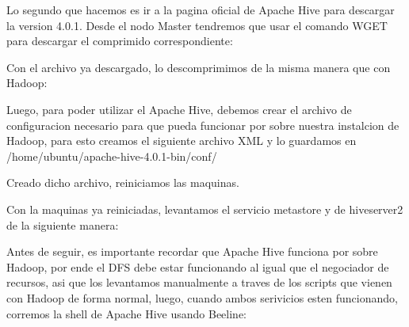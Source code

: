 \documentclass[9pt,letterpaper,twoside]{article}
\begin{document}
\noindent
Lo segundo que hacemos es ir a la pagina oficial de Apache Hive para descargar la version
4.0.1. Desde el nodo Master tendremos que usar el comando WGET para descargar el comprimido correspondiente:

\begin{code}[H]
    
\end{code}

\noindent
Con el archivo ya descargado, lo descomprimimos de la misma manera que con Hadoop:

\begin{code}[H]
    
\end{code}

\noindent
Luego, para poder utilizar el Apache Hive, debemos crear el archivo de configuracion necesario para que pueda funcionar por
sobre nuestra instalcion de Hadoop, para esto creamos el siguiente archivo XML y lo guardamos en 
/home/ubuntu/apache-hive-4.0.1-bin/conf/

\begin{code}[H]
    
\end{code}

\noindent
Creado dicho archivo, reiniciamos las maquinas.

\noindent
Con la maquinas ya reiniciadas, levantamos el servicio metastore y de hiveserver2 de la siguiente manera:

\begin{code}[H]
    
\end{code}

\noindent
Antes de seguir, es importante recordar que Apache Hive funciona por sobre Hadoop, por ende el DFS debe estar funcionando
al igual que el negociador de recursos, asi que los levantamos manualmente a traves de los scripts que vienen con Hadoop
de forma normal, luego, cuando ambos serivicios esten funcionando, corremos la shell de Apache Hive usando Beeline:

\begin{code}[H]
    
\end{code}
\end{document}

